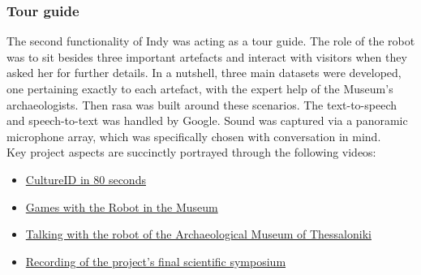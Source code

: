 \subsubsection{Tour guide}
The second functionality of Indy was acting as a tour guide. The role of the
robot was to sit besides three important artefacts and interact with visitors
when they asked her for further details. In a nutshell, three main datasets
were developed, one pertaining exactly to each artefact, with the expert help
of the Museum's archaeologists. Then rasa was built around these scenarios. The
text-to-speech and speech-to-text was handled by Google. Sound was captured via
a panoramic microphone array, which was specifically chosen with conversation
in mind. \\


\noindent Key project aspects are succinctly portrayed through the following videos:

\begin{itemize}
  \singlespacing
  \item \href{https://www.youtube.com/watch?v=SOA0To077WQ}{CultureID in 80 seconds}
  \item \href{https://www.youtube.com/watch?v=2EvTGNOqTrs}{Games with the Robot in the Museum}
  \item \href{https://www.youtube.com/watch?v=mrTL3Gep7Xk}{Talking with the robot of the Archaeological Museum of Thessaloniki}
  \item \href{https://www.youtube.com/watch?v=i5CUBswHWf0}{Recording of the project's final scientific symposium}
\end{itemize}




